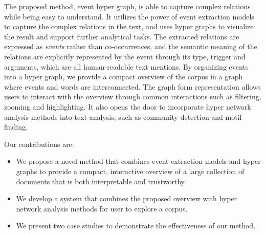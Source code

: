 The proposed method, event hyper graph, is able to capture complex relations while being easy to understand.
It utilizes the power of event extraction models to capture the complex relations in the text, and uses hyper graphs to visualize the result and support further analytical tasks.
The extracted relations are expressed as \textit{events} rather than co-occurrences,
and the semantic meaning of the relations are explicitly represented by the event through its type, trigger and arguments, which are all human-readable text mentions.
By organizing events into a hyper graph, we provide a compact overview of the corpus in a graph where events and words are interconnected. 
The graph form representation allows users to interact with the overview through common interactions such as filtering, zooming and highlighting.
It also opens the door to incorporate hyper network analysis methods into text analysis, such as community detection and motif finding.

Our contributions are:
\begin{itemize}
    \item We propose a novel method that combines event extraction models and hyper graphs to provide a compact, interactive overview of a large collection of documents that is both interpretable and trustworthy.
    \item We develop a system that combines the proposed overview with hyper network analysis methods for user to explore a corpus.
    \item We present two case studies to demonstrate the effectiveness of our method.
\end{itemize}

